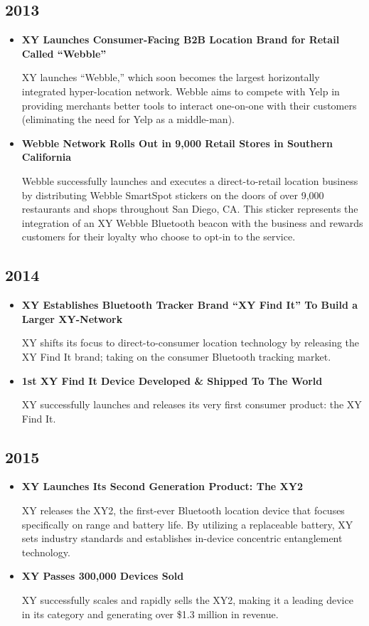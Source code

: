 \documentclass{article}
\begin{document}
\subsection{2013}
\begin{itemize}
\item\textbf{XY Launches Consumer-Facing B2B Location Brand for Retail Called ``Webble''}

XY launches ``Webble,'' which soon becomes the largest horizontally integrated hyper-location network. Webble aims to compete with Yelp in providing merchants better tools to interact one-on-one with their customers (eliminating the need for Yelp as a middle-man).

\item\textbf{Webble Network Rolls Out in 9,000 Retail Stores in Southern California}

Webble successfully launches and executes a direct-to-retail location business by distributing Webble SmartSpot stickers on the doors of over 9,000 restaurants and shops throughout San Diego, CA. This sticker represents the integration of an XY Webble Bluetooth beacon with the business and rewards customers for their loyalty who choose to opt-in to the service. 
\end{itemize}

\subsection{2014}
\begin{itemize}
\item \textbf{XY Establishes Bluetooth Tracker Brand ``XY Find It'' To Build a Larger XY-Network}

XY shifts its focus to direct-to-consumer location technology by releasing the XY Find It brand; taking on the consumer Bluetooth tracking market.

\item \textbf{1st XY Find It Device Developed \& Shipped To The World}

XY successfully launches and releases its very first consumer product: the XY Find It.
\end{itemize}

\subsection{2015}
\begin{itemize}
\item \textbf{XY Launches Its Second Generation Product: The XY2}

XY releases the XY2, the first-ever Bluetooth location device that focuses specifically on range and battery life. By utilizing a replaceable battery, XY sets industry standards and establishes in-device concentric entanglement technology.

\item \textbf{XY Passes 300,000 Devices Sold}

XY successfully scales and rapidly sells the XY2, making it a leading device in its category and generating over \$1.3 million in revenue.
\end{itemize}
\end{document}
